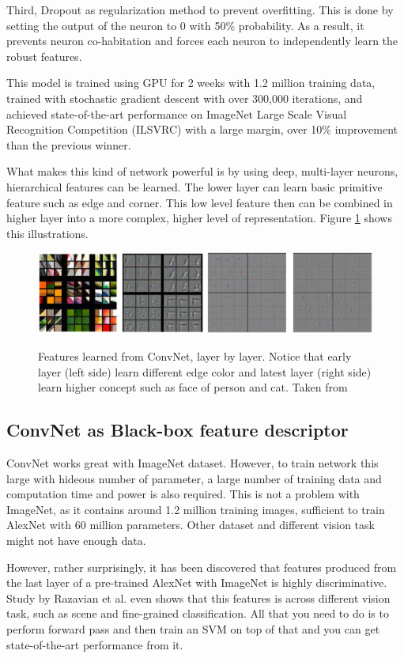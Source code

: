 \documentclass[a4paper,11pt]{kth-mag}
\begin{document}
Third, Dropout as regularization method to prevent overfitting. This is done by setting the output of the neuron to 0 with 50\% probability. As a result, it prevents neuron co-habitation and forces each neuron to independently learn the robust features.

This model is trained using GPU for 2 weeks with 1.2 million training data, trained with stochastic gradient descent with over 300,000 iterations, and achieved state-of-the-art performance on ImageNet Large Scale Visual Recognition Competition (ILSVRC) \cite{alexnet} with a large margin, over 10\% improvement than the previous winner.

What makes this kind of network powerful is by using deep, multi-layer neurons, hierarchical features can be learned. The lower layer can learn basic primitive feature such as edge and corner. This low level feature then can be combined in higher layer into a more complex, higher level of representation. Figure \ref{fig:convnet_features} shows this illustrations.

\begin{figure}[h]
\centering
\includegraphics[scale=0.4]{image/convnet_features.png}
\label{fig:convnet_features}
\caption{Features learned from ConvNet, layer by layer. Notice that early layer (left side) learn different edge color and latest layer (right side) learn higher concept such as face of person and cat. Taken from \cite{zeiler}}
\end{figure}

\subsection{ConvNet as Black-box feature descriptor}
ConvNet works great with ImageNet dataset. However, to train network this large with hideous number of parameter, a large number of training data and computation time and power is also required. This is not a problem with ImageNet, as it contains around 1.2 million training images, sufficient to train AlexNet with 60 million parameters. Other dataset and different vision task might not have enough data.

However, rather surprisingly, it has been discovered that features produced from the last layer of a pre-trained AlexNet with ImageNet is highly discriminative. Study by Razavian et al. \cite{razavian} even shows that this features is across different vision task, such as scene and fine-grained classification. All that you need to do is to perform forward pass and then train an SVM on top of that and you can get state-of-the-art performance from it.
\end{document}
